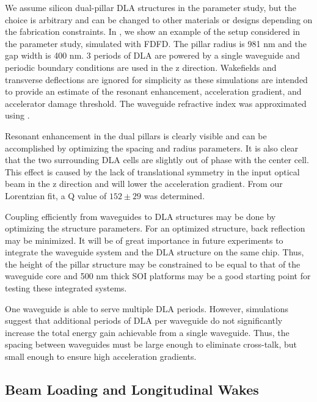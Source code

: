 We assume silicon dual-pillar DLA structures in the parameter study, but the choice is arbitrary and can be changed to other materials or designs depending on the fabrication constraints.
In , we show an example of the setup considered in the parameter study, simulated with FDFD.
The pillar radius is 981 nm and the gap width is 400 nm.
3 periods of DLA are powered by a single waveguide and periodic boundary conditions are used in the z direction.
Wakefields and transverse deflections are ignored for simplicity as these simulations are intended to provide an estimate of the resonant enhancement, acceleration gradient, and accelerator damage threshold.
The waveguide refractive index was approximated using \cite{smotrova2005cold}.

Resonant enhancement in the dual pillars is clearly visible and can be accomplished by optimizing the spacing and radius parameters.
 It is also clear that the two surrounding DLA cells are slightly out of phase with the center cell.
 This effect is caused by the lack of translational symmetry in the input optical beam in the z direction and will lower the acceleration gradient.
  From our Lorentzian fit, a Q value of $152 \pm 29$ was determined.



Coupling efficiently from waveguides to DLA structures may be done by optimizing the structure parameters.
For an optimized structure, back reflection may be minimized.
It will be of great importance in future experiments to integrate the waveguide system and the DLA structure on the same chip.
Thus, the height of the pillar structure may be constrained to be equal to that of the waveguide core and 500 nm thick SOI platforms may be a good starting point for testing these integrated systems.


One waveguide is able to serve multiple DLA periods.
 However, simulations suggest that additional periods of DLA per waveguide do not significantly increase the total energy gain achievable from a single waveguide.
 Thus, the spacing between waveguides must be large enough to eliminate cross-talk, but small enough to ensure high acceleration gradients.

\subsection{Beam Loading and Longitudinal Wakes}


